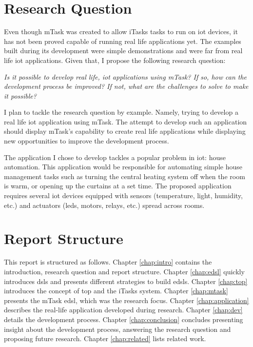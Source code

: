 \section{Research Question}
Even though mTask was created to allow iTasks tasks to run on \acs{iot} devices, it has not been proved capable of running real life applications yet. The examples built during its development were simple demonstrations and were far from real life \acs{iot} applications. Given that, I propose the following research question:
\begin{center}
\emph{Is it possible to develop real life, \acs{iot} applications using mTask? If so, how can the development process be improved? If not, what are the challenges to solve to make it possible?}
\end{center}
I plan to tackle the research question by example. Namely, trying to develop a real life \acs{iot} application using mTask. The attempt to develop such an application should display mTask's capability to create real life applications while displaying new opportunities to improve the development process.

The application I chose to develop tackles a popular problem in \acrshort{iot}: house automation. This application would be responsible for automating simple house management tasks such as turning the central heating system off when the room is warm, or opening up the curtains at a set time. The proposed application requires several \acrshort{iot} devices equipped with sensors (temperature, light, humidity, etc.) and actuators (\acsp{led}, motors, relays, etc.) spread across rooms. 


\section{Report Structure}

This report is structured as follows. Chapter \ref{chap:intro} contains the introduction, research question and report structure. Chapter \ref{chap:edsl} quickly introduces \acp{dsl} and presents different strategies to build \acp{edsl}. Chapter \ref{chap:top} introduces the concept of \ac{top} and the iTasks system. Chapter \ref{chap:mtask} presents the mTask \ac{edsl}, which was the research focus. Chapter \ref{chap:application} describes the real-life application developed during research. Chapter \ref{chap:dev} details the development process. Chapter \ref{chap:conclusion} concludes presenting insight about the development process, answering the research question and proposing future research. Chapter \ref{chap:related} lists related work.

